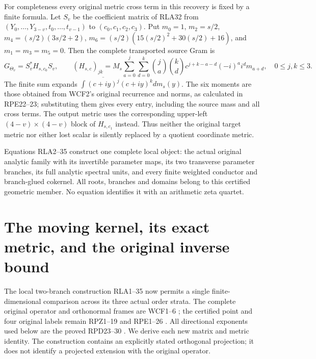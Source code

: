 \documentclass[11pt]{article}
\begin{document}
For completeness every original metric cross term in this recovery
is fixed by a finite formula.  Let $S_v$ be the coefficient matrix
of RLA32 from $(Y_0,\ldots,Y_{3-v},t_0,\ldots,t_{v-1})$ to
$(c_0,c_1,c_2,c_3)$.  Put $m_0=1$, $m_2=s/2$,
$m_4=(s/2)(3s/2+2)$, $m_6=(s/2)(15(s/2)^2+30(s/2)+16)$,
and $m_1=m_3=m_5=0$.  Then the complete transported source Gram is
\[
 G_{\Theta_v}=S_v^*H_{s,c_0}S_v,\qquad
 (H_{s,c})_{jk}=M_s\sum_{a=0}^j\sum_{d=0}^k
 \binom ja\binom kd c^{j+k-a-d}(-i)^ai^d m_{a+d},
 \quad0\le j,k\le3.
 \tag{RLA35}
\]
The finite sum expands
$\int\overline{(c+iy)^j}(c+iy)^kdm_s(y)$.
The six moments are those obtained from WCF2's original recurrence
and norms, as calculated in RPE22--23; substituting them gives
every entry, including the source mass and all cross terms.
The output metric uses the corresponding upper-left
$(4-v)\times(4-v)$ block of $H_{s,c_1}$ instead.
Thus neither the original target metric nor either lost scalar is
silently replaced by a quotient coordinate metric.

Equations RLA2--35 construct one complete local object: the actual
original analytic family with its invertible parameter maps, its
two transverse parameter branches, its full analytic spectral units,
and every finite weighted conductor and branch-glued cokernel.
All roots, branches and domains belong to this certified geometric
member.  No equation identifies it with an arithmetic zeta quartet.

\section{The moving kernel, its exact metric, and the original inverse bound}
\label{sec:real-pair-moving-quotient}
The local two-branch construction RLA1--35 now permits a single
finite-dimensional comparison across its three actual order strata.
The complete original operator and orthonormal frames are WCF1--6
\cite{WCF}; the certified point and four original labels remain
RPZ1--19 and RPE1--26 \cite{RPZ005,RPE005}.  All directional
exponents used below are the proved RPD23--30 \cite{RPD006}.
We derive each new matrix and metric identity.  The construction
contains an explicitly stated orthogonal projection; it does not
identify a projected extension with the original operator.
\end{document}
